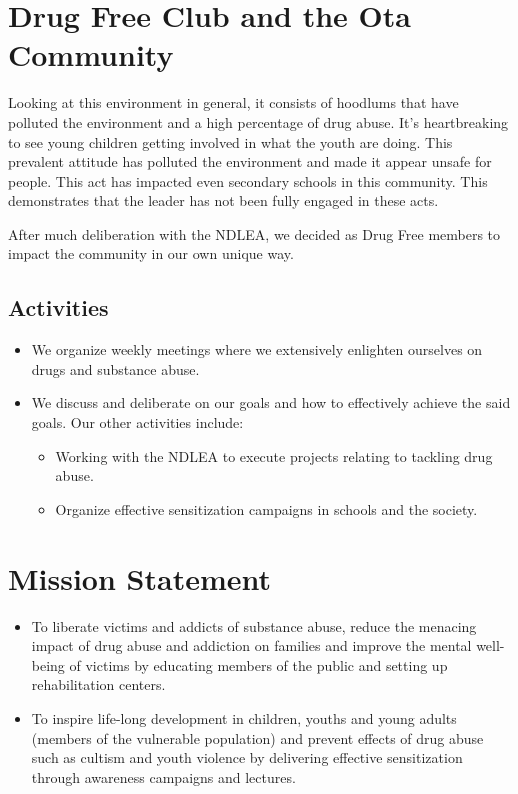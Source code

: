 \documentclass{report}
\begin{document}
\section{Drug Free Club and the Ota Community}
Looking at this environment in general, it consists of hoodlums that have polluted the environment and a high percentage of drug abuse. It's heartbreaking to see young children getting involved in what the youth are doing. This prevalent attitude has polluted the environment and made it appear unsafe for people. This act has impacted even secondary schools in this community. This demonstrates that the leader has not been fully engaged in these acts.

After much deliberation with the NDLEA, we decided as Drug Free members to impact the community in our own unique way.

\subsection{Activities}
\begin{itemize}
    \item 
    We organize weekly meetings where we extensively enlighten ourselves on drugs and substance abuse. 
    
    \item
    We discuss and deliberate on our goals and how to effectively achieve the said goals. Our other activities include:

\begin{itemize}
    \item 
    Working with the NDLEA to execute projects relating to tackling drug abuse.
    
    \item
    Organize effective sensitization campaigns in schools and the society.
\end{itemize}

\end{itemize}


\section{Mission Statement}
\begin{itemize}
    \item 
    To liberate victims and addicts of substance abuse, reduce the menacing impact of drug abuse and addiction on families and improve the mental well-being of victims by educating members of the public and setting up rehabilitation centers.
    
    \item
    To inspire life-long development in children, youths and young adults (members of the vulnerable population) and prevent effects of drug abuse such as cultism and youth violence by delivering effective sensitization through awareness campaigns and lectures.
\end{itemize}
\end{document}
